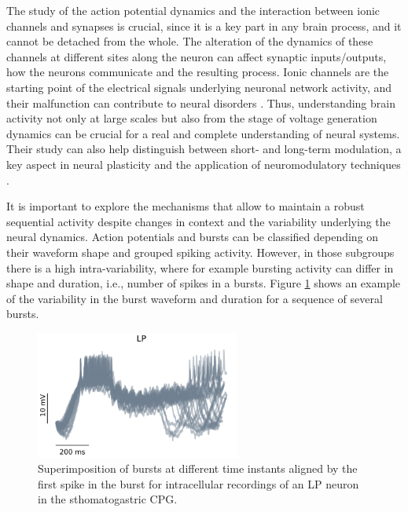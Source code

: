 The study of the action potential dynamics and the interaction between ionic channels and synapses is crucial, since it is a key part in any brain process, and it cannot be detached from the whole. The alteration of the dynamics of these channels at different sites along the neuron can affect synaptic inputs/outputs, how the neurons communicate and the resulting process. Ionic channels are the starting point of the electrical signals underlying neuronal network activity, and their malfunction can contribute to neural disorders \parencite{kecskes_editorial_2023}. Thus, understanding brain activity not only at large scales but also from the stage of voltage generation dynamics can be crucial for a real and complete understanding of neural systems. Their study can also help distinguish between short- and long-term modulation, a key aspect in neural plasticity and the application of neuromodulatory techniques \parencite{chambers_light-activated_2008,burke_modulation_2019}.

 
It is important to explore the mechanisms that allow to maintain a robust sequential activity despite changes in context and the variability underlying the neural dynamics. Action potentials and bursts can be classified depending on their waveform shape and grouped spiking activity. However, in those subgroups there is a high intra-variability, where for example bursting activity can differ in shape and duration, i.e., number of spikes in a bursts. Figure \ref{fig:burst variability} shows an example of the variability in the burst waveform and duration for a sequence of several bursts. 


\begin{figure}[htb!]
	\centering
	\includegraphics[width=0.6\textwidth]{img/intro/burst_variability.png}
	\caption{Superimposition of bursts at different time instants aligned by the first spike in the burst for intracellular recordings of an LP neuron in the sthomatogastric CPG.}
	\label{fig:burst variability}
\end{figure}

